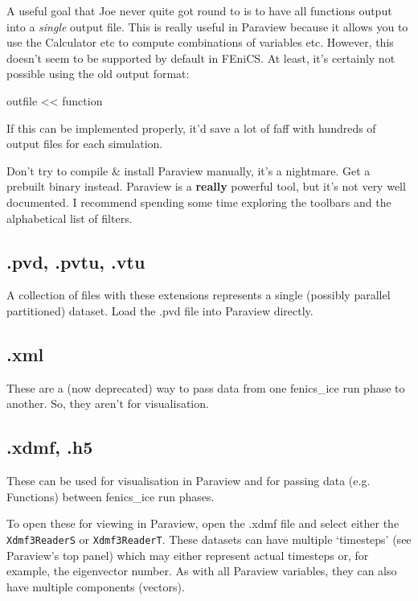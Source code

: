 \documentclass[11pt, reqno, nocenter]{article}
\begin{document}
A useful goal that Joe never quite got round to is to have all functions output into a \emph{single} output file. This is really useful in Paraview because it allows you to use the Calculator etc to compute combinations of variables etc. However, this doesn't seem to be supported by default in FEniCS. At least, it's certainly not possible using the old output format:

\begin{spverbatim}
outfile << function
\end{spverbatim}

If this can be implemented properly, it'd save a lot of faff with hundreds of output files for each simulation.

Don't try to compile \& install Paraview manually, it's a nightmare. Get a prebuilt binary instead. Paraview is a \textbf{really} powerful tool, but it's not very well documented. I recommend spending some time exploring the toolbars and the alphabetical list of filters.

\subsection{.pvd, .pvtu, .vtu}

A collection of files with these extensions represents a single (possibly parallel partitioned) dataset. Load the .pvd file into Paraview directly.

\subsection{.xml}

These are a (now deprecated) way to pass data from one fenics\_ice run phase to another. So, they aren't for visualisation.

\subsection{.xdmf, .h5}

These can be used for visualisation in Paraview and for passing data (e.g. Functions) between fenics\_ice run phases.

To open these for viewing in Paraview, open the .xdmf file and select either the \texttt{Xdmf3ReaderS} or \texttt{Xdmf3ReaderT}. These datasets can have multiple `timesteps' (see Paraview's top panel) which may either represent actual timesteps or, for example, the eigenvector number. As with all Paraview variables, they can also have multiple components (vectors).
\end{document}

